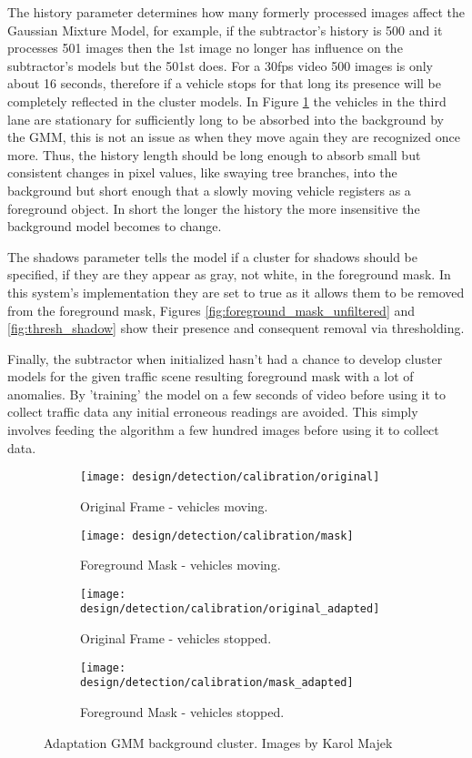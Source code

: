 The history parameter determines how many formerly processed images affect the Gaussian Mixture Model, for example, if the subtractor's history is 500 and it processes 501 images then the 1st image no longer has influence on the subtractor's models but the 501st does. For a 30fps video 500 images is only about 16 seconds, therefore if a vehicle stops for that long its presence will be completely reflected in the cluster models. In Figure \ref{fig:cluster_adaptation} the vehicles in the third lane are stationary for sufficiently long to be absorbed into the background by the GMM, this is not an issue as when they move again they are recognized once more. Thus, the history length should be long enough to absorb small but consistent changes in pixel values, like swaying tree branches, into the background but short enough that a slowly moving vehicle registers as a foreground object. In short the longer the history the more insensitive the background model becomes to change.

The shadows parameter tells the model if a cluster for shadows should be specified, if they are they appear as gray, not white, in the foreground mask. In this system's implementation they are set to true as it allows them to be removed from the foreground mask, Figures \ref{fig:foreground_mask_unfiltered} and \ref{fig:thresh_shadow} show their presence and consequent removal via thresholding. 

Finally, the subtractor when initialized hasn't had a chance to develop cluster models for the given traffic scene resulting foreground mask with a lot of anomalies. By 'training' the model on a few seconds of video before using it to collect traffic data any initial erroneous readings are avoided. This simply involves feeding the algorithm a few hundred images before using it to collect data.

\begin{figure}[H]
	\centering
	\begin{subfigure}[b]{0.4\linewidth}
        \centering\texttt{[image: design/detection/calibration/original]}
        \caption{Original Frame - vehicles moving.}
    \end{subfigure}%
    \begin{subfigure}[b]{0.4\linewidth}
        \centering\texttt{[image: design/detection/calibration/mask]}
        \caption{Foreground Mask - vehicles moving.}
    \end{subfigure}
    \begin{subfigure}[b]{0.4\linewidth}
        \centering\texttt{[image: design/detection/calibration/original\_adapted]}
        \caption{Original Frame - vehicles stopped.}
    \end{subfigure}%
    	\begin{subfigure}[b]{0.4\linewidth}
        \centering\texttt{[image: design/detection/calibration/mask\_adapted]}
        \caption{Foreground Mask - vehicles stopped.}
    \end{subfigure}
    \caption{Adaptation GMM background cluster. Images by Karol Majek}
    \label{fig:cluster_adaptation}
\end{figure}



